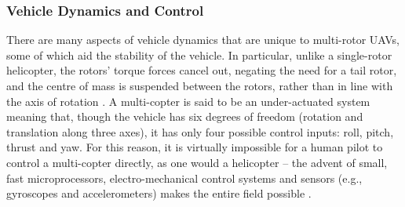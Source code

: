 





\subsubsection{Vehicle Dynamics and Control}

There are many aspects of vehicle dynamics that are unique to multi-rotor UAVs, some of which aid the stability of the vehicle. In particular, unlike a single-rotor helicopter, the rotors' torque forces cancel out, negating the need for a tail rotor, and the centre of mass is suspended between the rotors, rather than in line with the axis of rotation \cite{McKerrow2004}. A multi-copter is said to be an under-actuated system \cite{McKerrow2004,Mian2008,Valavanis2007} meaning that, though the vehicle has six degrees of freedom (rotation and translation along three axes), it has only four possible control inputs: roll, pitch, thrust and yaw. For this reason, it is virtually impossible for a human pilot to control a multi-copter directly, as one would a helicopter -- the advent of small, fast microprocessors, electro-mechanical control systems and sensors (e.g., gyroscopes and accelerometers) makes the entire field possible \cite{Hoffmann2007}. 


